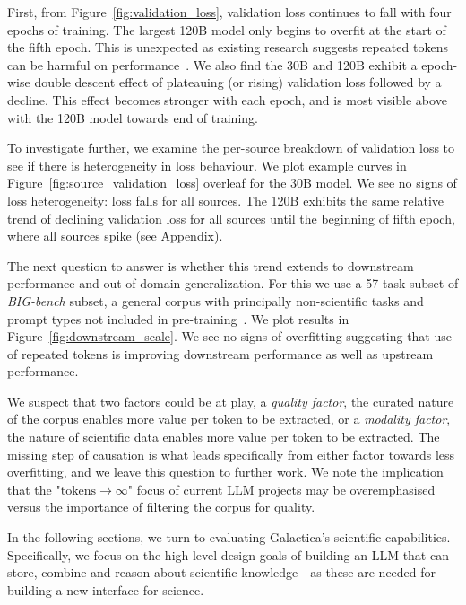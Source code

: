 First, from Figure~\ref{fig:validation_loss}, validation loss continues to fall with four epochs of training. The largest 120B model only begins to overfit at the start of the fifth epoch. This is unexpected as existing research suggests repeated tokens can be harmful on performance~\citep{HarmfulRepeats}. We also find the 30B and 120B exhibit a epoch-wise double descent effect of plateauing (or rising) validation loss followed by a decline. This effect becomes stronger with each epoch, and is most visible above with the 120B model towards end of training.

To investigate further, we examine the per-source breakdown of validation loss to see if there is heterogeneity in loss behaviour. We plot example curves in Figure~\ref{fig:source_validation_loss} overleaf for the 30B model. We see no signs of loss heterogeneity: loss falls for all sources. The 120B exhibits the same relative trend of declining validation loss for all sources until the beginning of fifth epoch, where all sources spike (see Appendix).

The next question to answer is whether this trend extends to downstream performance and out-of-domain generalization. For this we use a 57 task subset of \textit{BIG-bench} subset, a general corpus with principally non-scientific tasks and prompt types not included in pre-training~\citep{BIGBenchakasomanyauthorsitdoesntfitinthecontextwindow}. We plot results in Figure~\ref{fig:downstream_scale}. We see no signs of overfitting suggesting that use of repeated tokens is improving downstream performance as well as upstream performance.

We suspect that two factors could be at play, a \textit{quality factor}, the curated nature of the corpus enables more value per token to be extracted, or a \textit{modality factor}, the nature of scientific data enables more value per token to be extracted. The missing step of causation is what leads specifically from either factor towards less overfitting, and we leave this question to further work. We note the implication that the "$\text{tokens} \rightarrow \infty$" focus of current LLM projects may be overemphasised versus the importance of filtering the corpus for quality.

In the following sections, we turn to evaluating Galactica's scientific capabilities. Specifically, we focus on the high-level design goals of building an LLM that can store, combine and reason about scientific knowledge - as these are needed for building a new interface for science.

